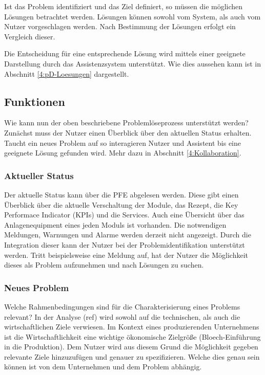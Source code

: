 Ist das Problem identifiziert und das Ziel definiert, so müssen die möglichen Lösungen betrachtet werden. Lösungen können sowohl vom System, als auch vom Nutzer vorgeschlagen werden. Nach Bestimmung der Lösungen erfolgt ein Vergleich dieser.

Die Entscheidung für eine entsprechende Lösung wird mittels einer geeignete Darstellung durch das Assistenzsystem unterstützt. Wie dies aussehen kann ist in Abschnitt \ref{4:pD-Loesungen} dargestellt.

\subsection{Funktionen}
Wie kann nun der oben beschriebene Problemlöseprozess unterstützt werden? Zunächst muss der Nutzer einen Überblick über den aktuellen Status erhalten. Taucht ein neues Problem auf so interagieren Nutzer und Assistent bis eine geeignete Lösung gefunden wird. Mehr dazu in Abschnitt \ref{4:Kollaboration}.

\subsubsection*{Aktueller Status}
Der aktuelle Status kann über die PFE abgelesen werden. Diese gibt einen Überblick über die aktuelle Verschaltung der Module, das Rezept, die Key Performace Indicator (KPIs) und die Services. Auch eine Übersicht über das Anlagenequipment eines jeden Moduls ist vorhanden. Die notwendigen Meldungen, Warnungen und Alarme werden derzeit nicht angezeigt. Durch die Integration dieser kann der Nutzer bei der Problemidentifikation unterstützt werden. Tritt beispielsweise eine Meldung auf, hat der Nutzer die Möglichkeit dieses als Problem aufzunehmen und nach Lösungen zu suchen.

\subsubsection*{Neues Problem}
Welche Rahmenbedingungen sind für die Charakterisierung eines Problems relevant? In der Analyse (ref) wird sowohl auf die technischen, als auch die wirtschaftlichen Ziele verwiesen. Im Kontext eines produzierenden Unternehmens ist die Wirtschaftlichkeit eine wichtige ökonomische Zielgröße \cite{} (Bloech-Einführung in die Produktion). Dem Nutzer wird aus diesem Grund die Möglichkeit gegeben relevante Ziele hinzuzufügen und genauer zu spezifizieren. Welche dies genau sein können ist von dem Unternehmen und dem Problem abhängig.

